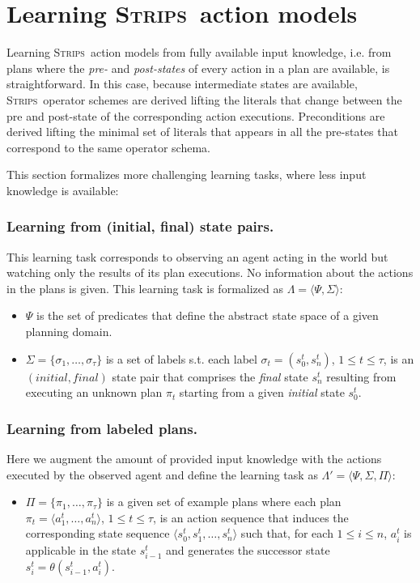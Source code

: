 \documentclass[letterpaper]{article} %
\newcommand{\tup}[1]{{\langle #1 \rangle}}
\newcommand{\strips}{\textsc{Strips}}     %
\begin{document}
\section{Learning \strips\ action models}
Learning \strips\ action models from fully available input knowledge, i.e. from plans where the {\em pre-} and {\em post-states} of every action in a plan are available, is straightforward. In this case, because intermediate states are available, \strips\ operator schemes are derived lifting the literals that change between the pre and post-state of the corresponding action executions. Preconditions are derived lifting the minimal set of literals that appears in all the pre-states that correspond to the same operator schema.

This section formalizes more challenging learning tasks, where less input knowledge is available:

\subsubsection{Learning from (initial, final) state pairs.} This learning task corresponds to observing an agent acting in the world but watching only the results of its plan executions. No information about the actions in the plans is given. This learning task is formalized as $\Lambda=\tup{\Psi,\Sigma}$:
\begin{itemize}
\item $\Psi$ is the set of predicates that define the abstract state space of a given planning domain.
\item $\Sigma=\{\sigma_1,\ldots,\sigma_{\tau}\}$ is a set of labels s.t. each label $\sigma_t=(s_0^t,s_{n}^t)$, {\tt\small $1\leq t\leq \tau$}, is an $(initial, final)$ state pair that comprises the {\em final} state $s_{n}^t$ resulting from executing an unknown plan $\pi_t$ starting from a given {\em initial} state $s_0^t$. 
\end{itemize}

\subsubsection{Learning from labeled plans.}
Here we augment the amount of provided input knowledge with the actions executed by the observed agent and define the learning task as $\Lambda'=\tup{\Psi,\Sigma,\Pi}$:

\begin{itemize}
\item $\Pi=\{\pi_1,\ldots,\pi_{\tau}\}$ is a given set of example plans where each plan $\pi_t=\tup{a_1^t, \ldots, a_n^t}$, {\small $1\leq t\leq \tau$}, is an action sequence that induces the corresponding state sequence $\tup{s_0^t, s_1^t, \ldots, s_n^t}$ such that, for each {\small $1\leq i\leq n$}, $a_i^t$ is applicable in the state $s_{i-1}^t$ and generates the successor state $s_i^t=\theta(s_{i-1}^t,a_i^t)$. 
\end{itemize}
\end{document}
